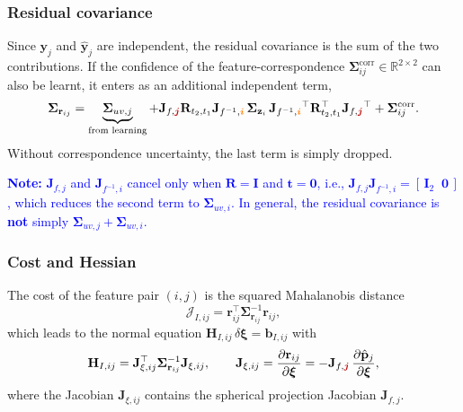 \subsubsection{Residual covariance}
Since $\mathbf{y}_j$ and $\hat{\mathbf{y}}_j$ are independent, the residual covariance is the sum of the two contributions. If the confidence of the feature-correspondence $\bm{\Sigma}_{ij}^{\mathrm{corr}} \in \mathbb{R}^{2\times 2}$ can also be learnt, it enters as an additional independent term,
\begin{equation}
    \label{eq:res_cov_2d}
    \bm{\Sigma}_{\mathbf{r}_{ij}} = \underbrace{\bm{\Sigma}_{uv,j}}_{\text{from learning}} + \mathbf{J}_{f,\color{red}{\bm{j}}}\mathbf{R}_{t_2,t_1}\mathbf{J}_{f^{-1},\color{orange}{\bm{i}}}\,\bm{\Sigma}_{\mathbf{z}_i}\,\mathbf{J}_{f^{-1},\color{orange}{\bm{i}}}^{\top}\mathbf{R}_{t_2,t_1}^{\top}\mathbf{J}_{f,\color{red}{\bm{j}}}^{\top} + \bm{\Sigma}_{ij}^{\mathrm{corr}}.
\end{equation}
Without correspondence uncertainty, the last term is simply dropped.

\textcolor{blue}{\textbf{Note:} $\mathbf{J}_{f,j}$ and $\mathbf{J}_{f^{-1},i}$ cancel only when $\mathbf{R} = \mathbf{I}$ and $\mathbf{t} = \mathbf{0}$, i.e., $\mathbf{J}_{f,j}\mathbf{J}_{f^{-1},i} = [\,\mathbf{I}_2 \;\; \mathbf{0}\,]$, which reduces the second term to $\bm{\Sigma}_{uv,i}$. In general, the residual covariance is \textbf{not} simply $\bm{\Sigma}_{uv,j} + \bm{\Sigma}_{uv,i}$.}

\subsubsection{Cost and Hessian}
The cost of the feature pair $(i,j)$ is the squared Mahalanobis distance
\begin{equation}
    \mathcal{J}_{I,ij} = \mathbf{r}_{ij}^{\top}\bm{\Sigma}_{\mathbf{r}_{ij}}^{-1}\mathbf{r}_{ij},
\end{equation}
which leads to the normal equation $\mathbf{H}_{I,ij}\,\delta\bm{\xi} = \mathbf{b}_{I,ij}$ with
\begin{equation}
    \mathbf{H}_{I,ij} = \mathbf{J}_{\xi,ij}^{\top}\bm{\Sigma}_{\mathbf{r}_{ij}}^{-1}\mathbf{J}_{\xi,ij}, \qquad
    \mathbf{J}_{\xi,ij} = \frac{\partial \mathbf{r}_{ij}}{\partial \bm{\xi}} = -\mathbf{J}_{f,\color{red}{\bm{j}}}\,\frac{\partial \hat{\mathbf{p}}_j}{\partial \bm{\xi}},
\end{equation}
where the Jacobian $\mathbf{J}_{\xi,ij}$ contains the spherical projection Jacobian $\mathbf{J}_{f,j}$.


